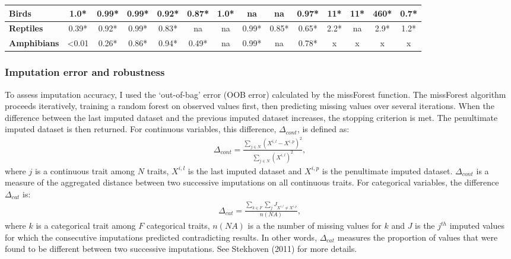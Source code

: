 \begin{table}[h!]
\begin{center}
\begin{tabular}{|l|c|c|c|c|c|c|c|c|c|c|c|c|c|}
\textbf{Birds}                                        & 1.0*              & 0.99*        & 0.99*          & 0.92*         & 0.87*         & 1.0*          & na           & na           & 0.97*        & 11*                    & 11*                    & 460*                   & 0.7*                   \\ \hline
\textbf{Reptiles}                                     & 0.39*             & 0.92*        & 0.99*          & 0.83*         & na            & na            & 0.99*        & 0.85*        & 0.65*        & 2.2*                   & na                     & 2.9*                   & 1.2*                   \\ \hline
\textbf{Amphibians}                                   & \textless{}0.01   & 0.26*        & 0.86*          & 0.94*         & 0.49*         & na            & 0.99*        & na           & 0.78*        & x                      & x                      & x                      & x                      \\ \hline
\end{tabular}
\end{center}
\end{table}



\subsubsection{Imputation error and robustness}
To assess imputation accuracy, I used the `out-of-bag' error (OOB error) calculated by the missForest function. The missForest algorithm proceeds iteratively, training a random forest on observed values first, then predicting missing values over several iterations. When the difference between the last imputed dataset and the previous imputed dataset increases, the stopping criterion is met. The penultimate imputed dataset is then returned. For continuous variables, this difference, $\Delta_{cont}$,  is defined as:
\begin{align}
\Delta_{cont}=\frac{\sum_{j \in N}\left(X^{i,l}-X^{i,p}\right)^2}{\sum_{j \in N}\left(X^{i,l}\right)^2}, 
\end{align}
where $j$ is a continuous trait among $N$ traits, $X^{i,l}$ is the last imputed dataset and $X^{i,p}$ is the penultimate imputed dataset.  $\Delta_{cont}$ is a measure of the aggregated distance between two successive imputations on all continuous traits.  For categorical variables, the difference $\Delta_{cat}$ is:
\begin{align}
\Delta_{cat}=\frac{\sum_{k \in F}\sum_{j} J_{X^{i,l}\neq X^{i,p}}}{n(NA)}, 
\label{eqPFC}
\end{align}
where $k$ is a categorical trait among $F$ categorical traits, $n(NA)$ is a the number of missing values for $k$ and $J$ is the $j^{th}$ imputed values for which the consecutive imputations predicted contradicting results. In other words, $\Delta_{cat}$ measures the proportion of values that were found to be different between two successive imputations.
See Stekhoven (2011) for more details.

